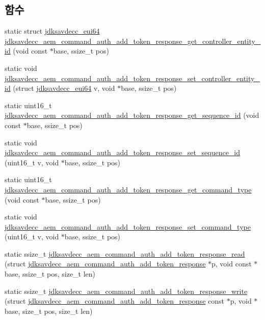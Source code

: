 \subsection*{함수}
\begin{DoxyCompactItemize}
\item 
static struct \hyperlink{structjdksavdecc__eui64}{jdksavdecc\+\_\+eui64} \hyperlink{group__command__auth__add__token__response_gaf4caf7faeecb2d0814dc79febecb9422}{jdksavdecc\+\_\+aem\+\_\+command\+\_\+auth\+\_\+add\+\_\+token\+\_\+response\+\_\+get\+\_\+controller\+\_\+entity\+\_\+id} (void const $\ast$base, ssize\+\_\+t pos)
\item 
static void \hyperlink{group__command__auth__add__token__response_ga0cc5541367f016de9f4d6e873b6685b7}{jdksavdecc\+\_\+aem\+\_\+command\+\_\+auth\+\_\+add\+\_\+token\+\_\+response\+\_\+set\+\_\+controller\+\_\+entity\+\_\+id} (struct \hyperlink{structjdksavdecc__eui64}{jdksavdecc\+\_\+eui64} v, void $\ast$base, ssize\+\_\+t pos)
\item 
static uint16\+\_\+t \hyperlink{group__command__auth__add__token__response_gacc2d45f4d0bf6bfcdfe09dd092d0c4e9}{jdksavdecc\+\_\+aem\+\_\+command\+\_\+auth\+\_\+add\+\_\+token\+\_\+response\+\_\+get\+\_\+sequence\+\_\+id} (void const $\ast$base, ssize\+\_\+t pos)
\item 
static void \hyperlink{group__command__auth__add__token__response_gae2d5f9a9eabfcb42d0f7e896c4142136}{jdksavdecc\+\_\+aem\+\_\+command\+\_\+auth\+\_\+add\+\_\+token\+\_\+response\+\_\+set\+\_\+sequence\+\_\+id} (uint16\+\_\+t v, void $\ast$base, ssize\+\_\+t pos)
\item 
static uint16\+\_\+t \hyperlink{group__command__auth__add__token__response_gaad6c924be2415732dc874827f3150bc9}{jdksavdecc\+\_\+aem\+\_\+command\+\_\+auth\+\_\+add\+\_\+token\+\_\+response\+\_\+get\+\_\+command\+\_\+type} (void const $\ast$base, ssize\+\_\+t pos)
\item 
static void \hyperlink{group__command__auth__add__token__response_ga74f8fceda26fe3b361cba741a795ae9a}{jdksavdecc\+\_\+aem\+\_\+command\+\_\+auth\+\_\+add\+\_\+token\+\_\+response\+\_\+set\+\_\+command\+\_\+type} (uint16\+\_\+t v, void $\ast$base, ssize\+\_\+t pos)
\item 
static ssize\+\_\+t \hyperlink{group__command__auth__add__token__response_gadd47e3f2f03a4a424ee687b8054e7d20}{jdksavdecc\+\_\+aem\+\_\+command\+\_\+auth\+\_\+add\+\_\+token\+\_\+response\+\_\+read} (struct \hyperlink{structjdksavdecc__aem__command__auth__add__token__response}{jdksavdecc\+\_\+aem\+\_\+command\+\_\+auth\+\_\+add\+\_\+token\+\_\+response} $\ast$p, void const $\ast$base, ssize\+\_\+t pos, size\+\_\+t len)
\item 
static ssize\+\_\+t \hyperlink{group__command__auth__add__token__response_ga63b1c554f72e95db16c232abd7e0dd4e}{jdksavdecc\+\_\+aem\+\_\+command\+\_\+auth\+\_\+add\+\_\+token\+\_\+response\+\_\+write} (struct \hyperlink{structjdksavdecc__aem__command__auth__add__token__response}{jdksavdecc\+\_\+aem\+\_\+command\+\_\+auth\+\_\+add\+\_\+token\+\_\+response} const $\ast$p, void $\ast$base, size\+\_\+t pos, size\+\_\+t len)
\end{DoxyCompactItemize}


